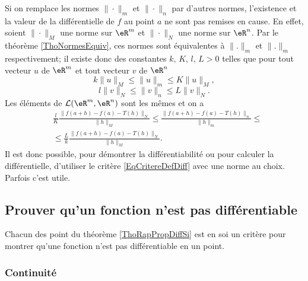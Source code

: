 \begin{remark}
	Si on remplace les normes $\|\cdot\|_m$  et $\|\cdot\|_n$ par d'autres normes, l'existence et la valeur de la différentielle de $f$ au point $a$ ne sont pas remises en cause. En effet, soient  $\|\cdot\|_M$  une norme sur $\eR^m$ et $\|\cdot\|_N$ une norme sur $\eR^n$. Par le théorème \ref{ThoNormesEquiv}, ces normes sont équivalentes à $\| . \|_m$ et $\| . \|_m$ respectivement; il existe donc des constantes $k,\, K,\, l,\,L >0$ telles que  pour tout vecteur $u$ de $\eR^m$ et tout vecteur $v$ de $\eR^n$   
\[
k\|u\|_M\leq \|u\|_m\leq K\|u\|_M,
\]
\[
l\|v\|_N\leq \|v\|_n\leq L\|v\|_N.
\]
Les éléments de $\mathcal{L}(\eR^m, \eR^n)$ sont les mêmes et on a 
\begin{equation}
  \begin{aligned}
 & \frac{l}{K}  \frac{\|f(a+h)-f(a)-T(h)\|_N}{\|h\|_M}\leq \frac{\|f(a+h)-f(a)-T(h)\|_n}{\|h\|_m}\leq\\
&\leq\frac{L}{k} \frac{\|f(a+h)-f(a)-T(h)\|_N}{\|h\|_M}.
  \end{aligned}
\end{equation}
Il est donc possible, pour démontrer la différentiabilité ou pour calculer la différentielle, d'utiliser le critère \eqref{EqCritereDefDiff} avec une norme au choix. Parfois c'est utile.
\end{remark}

                    \subsection{Prouver qu'un fonction n'est pas différentiable}

Chacun des point du théorème \ref{ThoRapPropDiffSi} est en soi un critère pour montrer qu'une fonction n'est pas différentiable en un point.

                    \subsubsection{Continuité}


